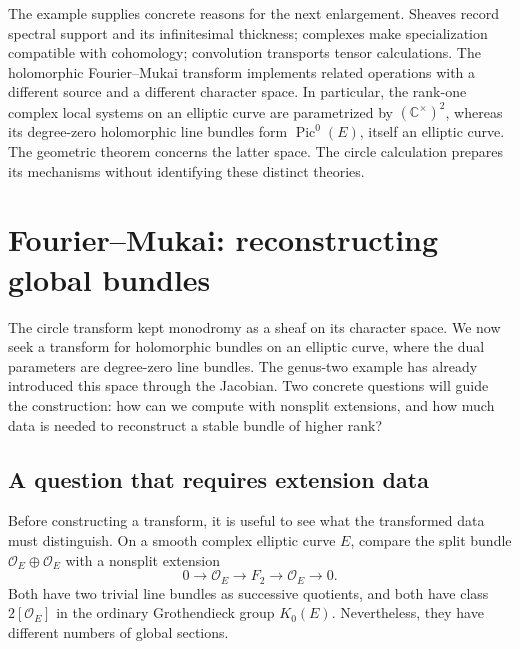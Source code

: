\documentclass[11pt]{article}
\theoremstyle{remark}
\newcommand{\C}{\mathbb C}
\begin{document}
The example supplies concrete reasons for the next enlargement. Sheaves record spectral support and its infinitesimal thickness; complexes make specialization compatible with cohomology; convolution transports tensor calculations. The holomorphic Fourier--Mukai transform implements related operations with a different source and a different character space. In particular, the rank-one complex local systems on an elliptic curve are parametrized by \((\C^\times)^2\), whereas its degree-zero holomorphic line bundles form \(\operatorname{Pic}^0(E)\), itself an elliptic curve. The geometric theorem concerns the latter space. The circle calculation prepares its mechanisms without identifying these distinct theories.

\section{Fourier--Mukai: reconstructing global bundles}
\label{categorical:section}

The circle transform kept monodromy as a sheaf on its character space. We now seek a transform for holomorphic bundles on an elliptic curve, where the dual parameters are degree-zero line bundles. The genus-two example has already introduced this space through the Jacobian. Two concrete questions will guide the construction: how can we compute with nonsplit extensions, and how much data is needed to reconstruct a stable bundle of higher rank?


\subsection{A question that requires extension data}

Before constructing a transform, it is useful to see what the transformed data must distinguish. On a smooth complex elliptic curve \(E\), compare the split bundle \(\mathcal O_E\oplus\mathcal O_E\) with a nonsplit extension
\begin{equation}
0\longrightarrow\mathcal O_E\longrightarrow F_2
\longrightarrow\mathcal O_E\longrightarrow0.
\label{categorical:f2}
\end{equation}
Both have two trivial line bundles as successive quotients, and both have class \(2[\mathcal O_E]\) in the ordinary Grothendieck group \(K_0(E)\). Nevertheless, they have different numbers of global sections.
\end{document}
